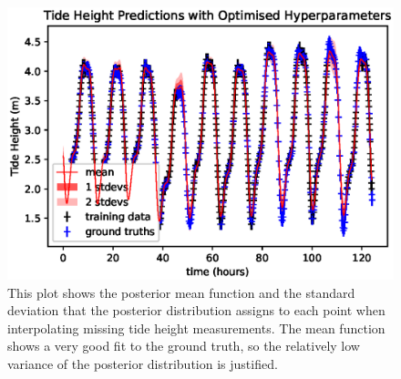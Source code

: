 \documentclass{article}
\begin{document}
                \begin{figure}
                    \includegraphics[width=\linewidth,height=\textheight,keepaspectratio]{tide_height_interpolation.eps}
                    \caption{This plot shows the posterior mean function and the standard deviation that the posterior distribution assigns to each point when interpolating missing tide height measurements. The mean function shows a very good fit to the ground truth, so the relatively low variance of the posterior distribution is justified.}
                    \label{plot_tideheightinterpolation}
                \end{figure}

            \FloatBarrier
%
%
%
%
%
%
%
%
\end{document}
